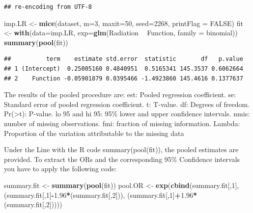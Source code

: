 \documentclass[
]{book}
\newenvironment{Shaded}{\begin{snugshade}}{\end{snugshade}}
\newcommand{\DataTypeTok}[1]{\textcolor[rgb]{0.13,0.29,0.53}{#1}}
\newcommand{\DecValTok}[1]{\textcolor[rgb]{0.00,0.00,0.81}{#1}}
\newcommand{\FloatTok}[1]{\textcolor[rgb]{0.00,0.00,0.81}{#1}}
\newcommand{\KeywordTok}[1]{\textcolor[rgb]{0.13,0.29,0.53}{\textbf{#1}}}
\newcommand{\NormalTok}[1]{#1}
\newcommand{\OperatorTok}[1]{\textcolor[rgb]{0.81,0.36,0.00}{\textbf{#1}}}
\newcommand{\OtherTok}[1]{\textcolor[rgb]{0.56,0.35,0.01}{#1}}
\newcommand{\StringTok}[1]{\textcolor[rgb]{0.31,0.60,0.02}{#1}}
\begin{document}
\begin{verbatim}
## re-encoding from UTF-8
\end{verbatim}

\begin{Shaded}
\begin{Highlighting}[]
\NormalTok{imp.LR <-}\StringTok{ }\KeywordTok{mice}\NormalTok{(dataset, }\DataTypeTok{m=}\DecValTok{3}\NormalTok{, }\DataTypeTok{maxit=}\DecValTok{50}\NormalTok{, }\DataTypeTok{seed=}\DecValTok{2268}\NormalTok{, }\DataTypeTok{printFlag =} \OtherTok{FALSE}\NormalTok{)}
\NormalTok{fit <-}\StringTok{ }\KeywordTok{with}\NormalTok{(}\DataTypeTok{data=}\NormalTok{imp.LR, }\DataTypeTok{exp=}\KeywordTok{glm}\NormalTok{(Radiation }\OperatorTok{~}\StringTok{ }\NormalTok{Function, }\DataTypeTok{family =}\NormalTok{ binomial))}
\KeywordTok{summary}\NormalTok{(}\KeywordTok{pool}\NormalTok{(fit))}
\end{Highlighting}
\end{Shaded}

\begin{verbatim}
##          term    estimate std.error  statistic       df   p.value
## 1 (Intercept)  0.25005160 0.4840951  0.5165341 145.3537 0.6062664
## 2    Function -0.05901879 0.0395466 -1.4923860 145.4616 0.1377637
\end{verbatim}

The results of the pooled procedure are:
est: Pooled regression coefficient.
se: Standard error of pooled regression coefficient.
t: T-value.
df: Degrees of freedom.
Pr(\textgreater\textbar t\textbar): P-value.
lo 95 and hi 95: 95\% lower and upper confidence intervals.
nmis: number of missing observations.
fmi: fraction of missing information.
Lambda: Proportion of the variation attributable to the missing data

Under the Line with the R code summary(pool(fit)), the pooled estimates are provided. To extract the ORs and the corresponding 95\% Confidence intervals you have to apply the following code:

\begin{Shaded}
\begin{Highlighting}[]
\NormalTok{summary.fit <-}\StringTok{ }\KeywordTok{summary}\NormalTok{(}\KeywordTok{pool}\NormalTok{(fit))}
\NormalTok{pool.OR <-}\StringTok{ }\KeywordTok{exp}\NormalTok{(}\KeywordTok{cbind}\NormalTok{(summary.fit[,}\DecValTok{1}\NormalTok{], (summary.fit[,}\DecValTok{1}\NormalTok{]}\OperatorTok{-}\FloatTok{1.96}\OperatorTok{*}\NormalTok{(summary.fit[,}\DecValTok{2}\NormalTok{])), }
\NormalTok{           (summary.fit[,}\DecValTok{1}\NormalTok{]}\OperatorTok{+}\FloatTok{1.96}\OperatorTok{*}\NormalTok{(summary.fit[,}\DecValTok{2}\NormalTok{]))))}
\end{Highlighting}
\end{Shaded}
\end{document}
